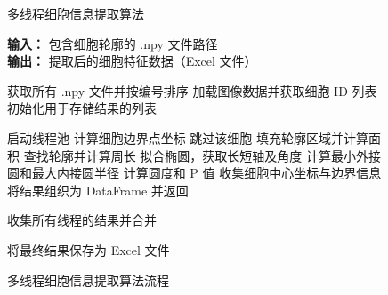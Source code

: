 \begin{figure}[htbp]
    \centering
    \begin{algorithm}[H]
        \caption{多线程细胞信息提取算法}
        \label{alg:cell_extraction}

        \textbf{输入：} 包含细胞轮廓的 .npy 文件路径 \\
        \textbf{输出：} 提取后的细胞特征数据（Excel 文件）
        
        \begin{algorithmic}[1]
            \STATE 获取所有 .npy 文件并按编号排序
                \STATE 加载图像数据并获取细胞 ID 列表
                \STATE 初始化用于存储结果的列表
                
                \STATE 启动线程池
                    \STATE 计算细胞边界点坐标
                        \STATE 跳过该细胞
                    \ELSE
                        \STATE 填充轮廓区域并计算面积
                        \STATE 查找轮廓并计算周长
                        \STATE 拟合椭圆，获取长短轴及角度
                        \STATE 计算最小外接圆和最大内接圆半径
                        \STATE 计算圆度和 P 值
                        \STATE 收集细胞中心坐标与边界信息
                        \STATE 将结果组织为 DataFrame 并返回
                    \ENDIF
                \ENDFOR
                
                \STATE 收集所有线程的结果并合并
            \ENDFOR
            
            \STATE 将最终结果保存为 Excel 文件
        \end{algorithmic}
    \end{algorithm}
    \caption{多线程细胞信息提取算法流程}\label{fig:flowchart3_2}
\end{figure}
